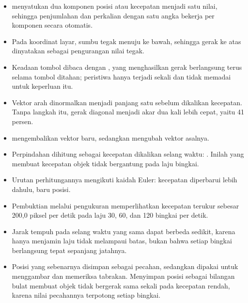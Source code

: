 
\begin{rangkumanbox}
\begin{itemize}
  \item {} menyatukan dua komponen posisi atau kecepatan
        menjadi satu nilai, sehingga penjumlahan dan perkalian dengan satu
        angka bekerja per komponen secara otomatis.
  \item Pada koordinat layar, sumbu tegak menuju ke bawah, sehingga gerak ke
        atas dinyatakan sebagai pengurangan nilai tegak.
  \item Keadaan tombol dibaca dengan , yang
        menghasilkan gerak berlangsung terus selama tombol ditahan; peristiwa
         hanya terjadi sekali dan tidak memadai untuk keperluan
        itu.
  \item Vektor arah dinormalkan menjadi panjang satu sebelum dikalikan
        kecepatan. Tanpa langkah itu, gerak diagonal menjadi akar dua kali
        lebih cepat, yaitu 41 persen.
  \item {} mengembalikan vektor baru, sedangkan
         mengubah vektor asalnya.
  \item Perpindahan dihitung sebagai kecepatan dikalikan selang waktu:
        . Inilah yang
        membuat kecepatan objek tidak bergantung pada laju bingkai.
  \item Urutan perhitungannya mengikuti kaidah Euler: kecepatan diperbarui
        lebih dahulu, baru posisi.
  \item Pembuktian melalui pengukuran memperlihatkan kecepatan terukur
        sebesar 200,0 piksel per detik pada laju 30, 60, dan 120 bingkai per
        detik.
  \item Jarak tempuh pada selang waktu yang sama dapat berbeda sedikit, karena
         hanya menjamin laju tidak melampaui batas, bukan
        bahwa setiap bingkai berlangsung tepat sepanjang jatahnya.
  \item Posisi yang sebenarnya disimpan sebagai pecahan, sedangkan
         dipakai untuk menggambar dan memeriksa tabrakan. Menyimpan
        posisi sebagai bilangan bulat membuat objek tidak bergerak sama sekali
        pada kecepatan rendah, karena nilai pecahannya terpotong setiap
        bingkai.
\end{itemize}
\end{rangkumanbox}
